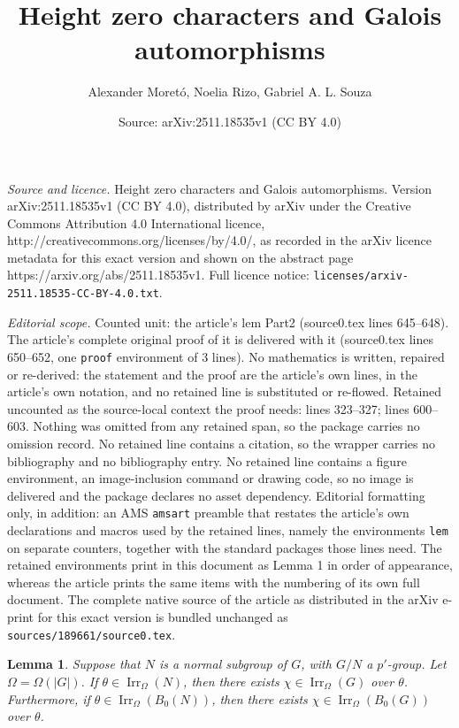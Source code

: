 \documentclass[10pt,a4paper]{amsart}
\title{Height zero characters and Galois automorphisms}
\author{Alexander Moret\'o, Noelia Rizo, Gabriel A. L. Souza}
\date{Source: arXiv:2511.18535v1 (CC BY 4.0)}
\newtheorem{lem}{Lemma}
\newcommand{\Irr}{{\operatorname{Irr}}}
\begin{document}
\maketitle

\noindent\emph{Source and licence.} Height zero characters and Galois automorphisms. Version arXiv:2511.18535v1 (CC BY 4.0), distributed by arXiv under the Creative Commons Attribution 4.0 International licence, http://creativecommons.org/licenses/by/4.0/, as recorded in the arXiv licence metadata for this exact version and shown on the abstract page https://arxiv.org/abs/2511.18535v1. Full licence notice: \texttt{licenses/arxiv-2511.18535-CC-BY-4.0.txt}.\par\smallskip

\noindent\textit{Editorial scope.} Counted unit: the article's lem Part2 (source0.tex lines 645--648). The article's complete original proof of it is delivered with it (source0.tex lines 650--652, one \texttt{proof} environment of 3 lines). No mathematics is written, repaired or re-derived: the statement and the proof are the article's own lines, in the article's own notation, and no retained line is substituted or re-flowed.  Retained uncounted as the source-local context the proof needs: lines 323--327; lines 600--603.  Nothing was omitted from any retained span, so the package carries no omission record.  No retained line contains a citation, so the wrapper carries no bibliography and no bibliography entry.  No retained line contains a figure environment, an image-inclusion command or drawing code, so no image is delivered and the package declares no asset dependency.  Editorial formatting only, in addition: an AMS \texttt{amsart} preamble that restates the article's own declarations and macros used by the retained lines, namely the environments \texttt{lem} on separate counters, together with the standard packages those lines need.  The retained environments print in this document as Lemma 1 in order of appearance, whereas the article prints the same items with the numbering of its own full document.  The complete native source of the article as distributed in the arXiv e-print for this exact version is bundled unchanged as \texttt{sources/189661/source0.tex}.
	\begin{lem}
		\label{3.2BHZG}
		Suppose that $N$ is a normal subgroup of $G$, with $G/N$ a $p'$-group. Let $\Omega = \Omega(|G|)$. If
		$\theta \in \Irr_{\Omega}(N)$, then there exists $\chi \in \Irr_{\Omega}(G)$ over $\theta$. Furthermore, if $\theta \in \Irr_{\Omega}(B_0(N))$, then there exists $\chi \in \Irr_{\Omega}(B_0(G))$ over $\theta$.
	\end{lem}
\end{document}
